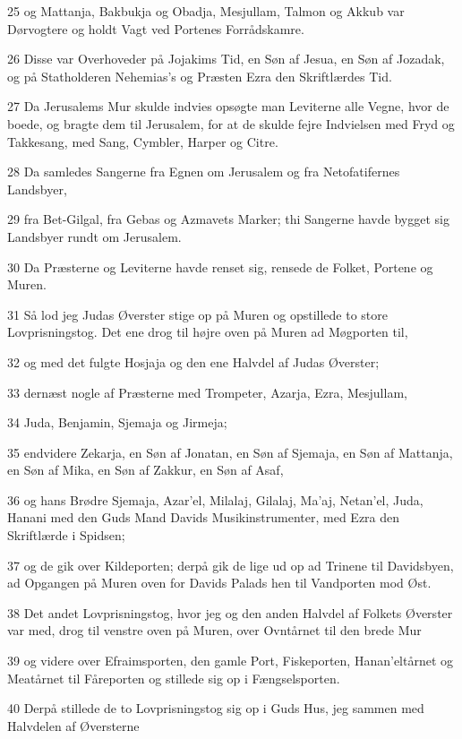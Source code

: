 \par 25 og Mattanja, Bakbukja og Obadja, Mesjullam, Talmon og Akkub var Dørvogtere og holdt Vagt ved Portenes Forrådskamre.
\par 26 Disse var Overhoveder på Jojakims Tid, en Søn af Jesua, en Søn af Jozadak, og på Statholderen Nehemias's og Præsten Ezra den Skriftlærdes Tid.
\par 27 Da Jerusalems Mur skulde indvies opsøgte man Leviterne alle Vegne, hvor de boede, og bragte dem til Jerusalem, for at de skulde fejre Indvielsen med Fryd og Takkesang, med Sang, Cymbler, Harper og Citre.
\par 28 Da samledes Sangerne fra Egnen om Jerusalem og fra Netofatifernes Landsbyer,
\par 29 fra Bet-Gilgal, fra Gebas og Azmavets Marker; thi Sangerne havde bygget sig Landsbyer rundt om Jerusalem.
\par 30 Da Præsterne og Leviterne havde renset sig, rensede de Folket, Portene og Muren.
\par 31 Så lod jeg Judas Øverster stige op på Muren og opstillede to store Lovprisningstog. Det ene drog til højre oven på Muren ad Møgporten til,
\par 32 og med det fulgte Hosjaja og den ene Halvdel af Judas Øverster;
\par 33 dernæst nogle af Præsterne med Trompeter, Azarja, Ezra, Mesjullam,
\par 34 Juda, Benjamin, Sjemaja og Jirmeja;
\par 35 endvidere Zekarja, en Søn af Jonatan, en Søn af Sjemaja, en Søn af Mattanja, en Søn af Mika, en Søn af Zakkur, en Søn af Asaf,
\par 36 og hans Brødre Sjemaja, Azar'el, Milalaj, Gilalaj, Ma'aj, Netan'el, Juda, Hanani med den Guds Mand Davids Musikinstrumenter, med Ezra den Skriftlærde i Spidsen;
\par 37 og de gik over Kildeporten; derpå gik de lige ud op ad Trinene til Davidsbyen, ad Opgangen på Muren oven for Davids Palads hen til Vandporten mod Øst.
\par 38 Det andet Lovprisningstog, hvor jeg og den anden Halvdel af Folkets Øverster var med, drog til venstre oven på Muren, over Ovntårnet til den brede Mur
\par 39 og videre over Efraimsporten, den gamle Port, Fiskeporten, Hanan'eltårnet og Meatårnet til Fåreporten og stillede sig op i Fængselsporten.
\par 40 Derpå stillede de to Lovprisningstog sig op i Guds Hus, jeg sammen med Halvdelen af Øversterne
